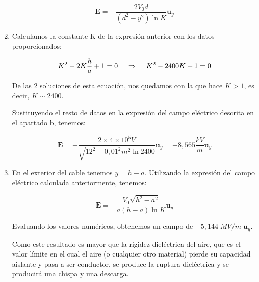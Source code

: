 \begin{enumerate}
    \begin{equation*}
        \textbf{E} = - \frac{2 V_0 d}{(d^2 - y^2) \ln{K} }  \textbf{u}_y
    \end{equation*}

    \vspace{20px}

    \item Calculamos la constante K de la expresión anterior con los datos proporcionados:

    \begin{equation*}
        K^2 - 2K\frac{h}{a} + 1 = 0 \hspace{12px} \Rightarrow \hspace{12px}  K^2 - 2400K + 1 = 0
    \end{equation*}

    De las 2 soluciones de esta ecuación, nos quedamos con la que hace $K > 1$, es decir, $K \sim 2400$.

    Sustituyendo el resto de datos en la expresión del campo eléctrico descrita en el apartado b, tenemos:

    \begin{equation*}
        \textbf{E} = - \frac{2 \times 4 \times 10^5 V}{ \sqrt {12^2-0,01^2}  m^2  \ln{2400}}  \textbf{u}_y = -8,565 \frac{kV}{m}  \textbf{u}_y
    \end{equation*}

    \vspace{20px}

    \item En el exterior del cable tenemos $y = h - a$. Utilizando la expresión del campo eléctrico calculada anteriormente, tenemos:


    \begin{equation*}
        \textbf{E} = - \frac{V_0 \sqrt{h^2 - a^2}}{ a (h - a) \ln{K}}  \textbf{u}_y
    \end{equation*}

    Evaluando los valores numéricos, obtenemos un campo de $- 5,144 \; MV /m \; \textbf{u}_y$.

    Como este resultado es mayor que la rigidez dieléctrica del aire, que es el valor límite en el cual el aire (o cualquier otro material)
    pierde su capacidad aislante y pasa a ser conductor, se produce la ruptura dieléctrica y se producirá una chispa y una descarga.

\end{enumerate}